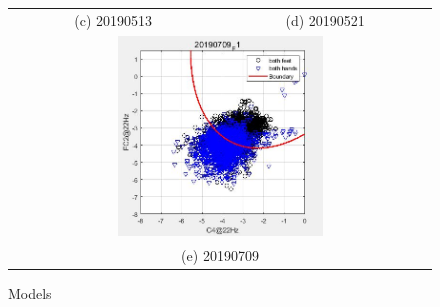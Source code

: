 \begin{figure}
\begin{tabular}{cc}
    (c) 20190513 & (d) 20190521 \\
    \multicolumn{2}{c}{\includegraphics[width=0.5\textwidth]{Figure/20190709_C.JPG} }\\
    \multicolumn{2}{c}{(e) 20190709}\\


\end{tabular}
\caption{Models}
\end{figure}






